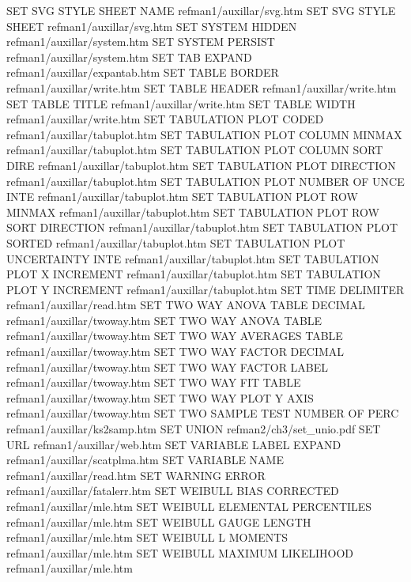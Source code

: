 SET SVG STYLE SHEET NAME                refman1/auxillar/svg.htm
SET SVG STYLE SHEET                     refman1/auxillar/svg.htm
SET SYSTEM HIDDEN                       refman1/auxillar/system.htm
SET SYSTEM PERSIST                      refman1/auxillar/system.htm
SET TAB EXPAND                          refman1/auxillar/expantab.htm
SET TABLE BORDER                        refman1/auxillar/write.htm
SET TABLE HEADER                        refman1/auxillar/write.htm
SET TABLE TITLE                         refman1/auxillar/write.htm
SET TABLE WIDTH                         refman1/auxillar/write.htm
SET TABULATION PLOT CODED               refman1/auxillar/tabuplot.htm
SET TABULATION PLOT COLUMN MINMAX       refman1/auxillar/tabuplot.htm
SET TABULATION PLOT COLUMN SORT DIRE    refman1/auxillar/tabuplot.htm
SET TABULATION PLOT DIRECTION           refman1/auxillar/tabuplot.htm
SET TABULATION PLOT NUMBER OF UNCE INTE refman1/auxillar/tabuplot.htm
SET TABULATION PLOT ROW MINMAX          refman1/auxillar/tabuplot.htm
SET TABULATION PLOT ROW SORT DIRECTION  refman1/auxillar/tabuplot.htm
SET TABULATION PLOT SORTED              refman1/auxillar/tabuplot.htm
SET TABULATION PLOT UNCERTAINTY INTE    refman1/auxillar/tabuplot.htm
SET TABULATION PLOT X INCREMENT         refman1/auxillar/tabuplot.htm
SET TABULATION PLOT Y INCREMENT         refman1/auxillar/tabuplot.htm
SET TIME DELIMITER                      refman1/auxillar/read.htm
SET TWO WAY ANOVA TABLE DECIMAL         refman1/auxillar/twoway.htm
SET TWO WAY ANOVA TABLE                 refman1/auxillar/twoway.htm
SET TWO WAY AVERAGES TABLE              refman1/auxillar/twoway.htm
SET TWO WAY FACTOR DECIMAL              refman1/auxillar/twoway.htm
SET TWO WAY FACTOR LABEL                refman1/auxillar/twoway.htm
SET TWO WAY FIT TABLE                   refman1/auxillar/twoway.htm
SET TWO WAY PLOT Y AXIS                 refman1/auxillar/twoway.htm
SET TWO SAMPLE TEST NUMBER OF PERC      refman1/auxillar/ks2samp.htm
SET UNION                               refman2/ch3/set_unio.pdf
SET URL                                 refman1/auxillar/web.htm
SET VARIABLE LABEL EXPAND               refman1/auxillar/scatplma.htm
SET VARIABLE NAME                       refman1/auxillar/read.htm
SET WARNING ERROR                       refman1/auxillar/fatalerr.htm
SET WEIBULL BIAS CORRECTED              refman1/auxillar/mle.htm
SET WEIBULL ELEMENTAL PERCENTILES       refman1/auxillar/mle.htm
SET WEIBULL GAUGE LENGTH                refman1/auxillar/mle.htm
SET WEIBULL L MOMENTS                   refman1/auxillar/mle.htm
SET WEIBULL MAXIMUM LIKELIHOOD          refman1/auxillar/mle.htm
